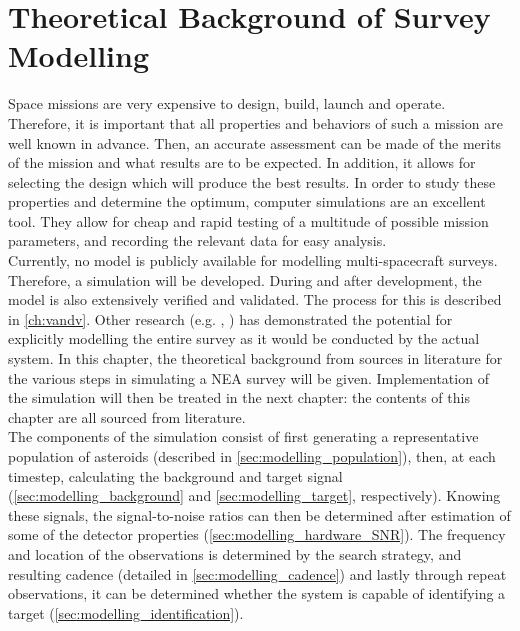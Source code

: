 \chapter{Theoretical Background of Survey Modelling}
\label{ch:surveymodelling}

Space missions are very expensive to design, build, launch and operate. Therefore, it is important that all properties and behaviors of such a mission are well known in advance. Then, an accurate assessment can be made of the merits of the mission and what results are to be expected. In addition, it allows for selecting the design which will produce the best results. In order to study these properties and determine the optimum, computer simulations are an excellent tool. They allow for cheap and rapid testing of a multitude of possible mission parameters, and recording the relevant data for easy analysis. \\

Currently, no model is publicly available for modelling multi-spacecraft surveys. Therefore, a simulation will be developed. During and after development, the model is also extensively verified and validated. The process for this is described in \autoref{ch:vandv}. Other research (e.g. \cite{Flyeye}, \cite{2017NEOSDT}) has demonstrated the potential for explicitly modelling the entire survey as it would be conducted by the actual system. In this chapter, the theoretical background from sources in literature for the various steps in simulating a NEA survey will be given. Implementation of the simulation will then be treated in the next chapter: the contents of this chapter are all sourced from literature.\\

The components of the simulation consist of first generating a representative population of asteroids (described in \autoref{sec:modelling_population}), then, at each timestep, calculating the background and target signal (\autoref{sec:modelling_background} and \autoref{sec:modelling_target}, respectively). Knowing these signals, the signal-to-noise ratios can then be determined after estimation of some of the detector properties (\autoref{sec:modelling_hardware_SNR}). The frequency and location of the observations is determined by the search strategy, and resulting cadence (detailed in \autoref{sec:modelling_cadence}) and lastly through repeat observations, it can be determined whether the system is capable of identifying a target (\autoref{sec:modelling_identification}).\\

